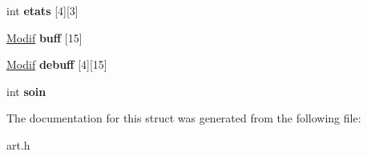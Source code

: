\begin{DoxyCompactItemize}
int {\bfseries etats} \mbox{[}4\mbox{]}\mbox{[}3\mbox{]}
\item 
\mbox{\label{structArt_a6dbeba257ee21e23068d23d04c3515eb}} 
\mbox{\hyperlink{structModif}{Modif}} {\bfseries buff} \mbox{[}15\mbox{]}
\item 
\mbox{\label{structArt_a752696c572827a57be56323d16cb4793}} 
\mbox{\hyperlink{structModif}{Modif}} {\bfseries debuff} \mbox{[}4\mbox{]}\mbox{[}15\mbox{]}
\item 
\mbox{\label{structArt_a7b16cebe11370a0eb8f9976eb1cc4ff2}} 
int {\bfseries soin}
\end{DoxyCompactItemize}


The documentation for this struct was generated from the following file\+:\begin{DoxyCompactItemize}
\item 
art.\+h\end{DoxyCompactItemize}
